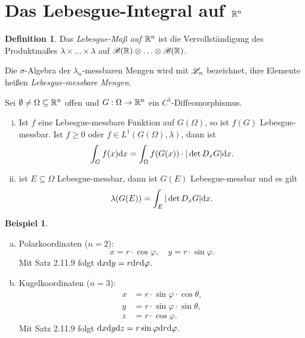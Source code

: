 \documentclass[
 a4paper,
 10pt,
 parskip=half
 ]{scrartcl}
\theoremstyle{plain}
\theoremstyle{definition}
\newtheorem*{defn}{Definition}
\newtheorem*{exmp}{Beispiel}
\numberwithin{equation}{section}
\begin{document}
\section*{Das Lebesgue-Integral auf \texorpdfstring{$\mathbb{R}^n$}{IRn}}
\begin{defn}
 Das \emph{Lebesgue-Maß auf $\mathbb{R}^n$} ist die Vervollständigung des
 Produktmaßes $\lambda \times \ldots \times \lambda$ auf $\mathscr{B}(\mathbb{R}) \otimes
 \ldots \otimes \mathscr{B}(\mathbb{R})$. 
\end{defn}
 
Die $\sigma$-Algebra der $\lambda_n$-messbaren Mengen wird mit $\mathscr{L}_n$
bezeichnet, ihre Elemente heißen \emph{Lebesgue-messbare Mengen}. 


\begin{thm}
  Sei $\emptyset \ne \Omega \subseteq \mathbb{R}^n$ offen und $G: \Omega \to \mathbb{R}^n$
  ein $C^1$-Diffeomorphismus.
  \begin{enumerate}[(i)]
    \item Ist $f$ eine Lebesgue-messbare Funktion auf $G(\Omega)$, so ist $f(G)$
      Lebesgue-messbar. Ist $f \ge 0$ oder $f \in L^1(G(\Omega),\lambda)$, dann
      ist
      \[ \int_G f(x) \mathrm{d} x = \int_\Omega f(G(x)) \cdot | \det D_xG |
        \mathrm{d} x. \]
    \item ist $E \subseteq \Omega$ Lebesgue-messbar, dann ist $G(E)$
      Lebesgue-messbar und es gilt
      \[ \lambda( G(E) ) = \int_E |\det D_x G| \mathrm{d} x. \]
  \end{enumerate}
\end{thm}

\begin{exmp}
  \begin{enumerate}[a)]
  \item Polarkoordinaten ($n=2$):
    \[ x = r \cdot \cos \varphi, \quad y = r \cdot \sin \varphi. \]
    Mit Satz 2.11.9 folgt $\mathrm{d} x \mathrm{d} y = r \mathrm{d} r \mathrm{d}
    \varphi$.
  \item Kugelkoordinaten ($n=3$):
    \begin{align*}
      x &= r \cdot \sin \varphi \cdot \cos \theta, \\
      y &= r \cdot \sin \varphi \cdot \sin \theta, \\
      z &= r \cdot \cos \varphi.
    \end{align*}
    Mit Satz 2.11.9 folgt $\mathrm{d} x \mathrm{d} y \mathrm{d} z = r \sin \varphi
    \mathrm{d} r \mathrm{d} \varphi$.
  \end{enumerate}
\end{exmp}
\end{document}
